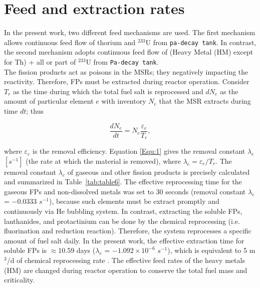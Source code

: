 \section{Feed and extraction rates}
In the present work, two different feed mechanisms are used. The first mechanism allows continuous feed flow of thorium and $^{233}$U from \texttt{pa-decay tank}. In contrast, the second mechanism adopts continuous feed flow of (Heavy Metal (HM) except for Th) + all or part of $^{233}$U from \texttt{Pa-decay tank}.\\
The fission products act as poisons in the MSRs; they negatively impacting the reactivity. Therefore, \gls{FPs} must be extracted during reactor operation. Consider $T_{r}$ as the time during which the total fuel salt is reprocessed and $dN_{e}$ as the amount of particular element $e$ with inventory $N_{e}$ that the \gls{MSR} extracts during time $dt$; thus \cite{nuttin2005potential}

\begin{equation}
\label{Equ:1}
\dfrac{dN_{e}}{dt} = N_{e}\dfrac{\varepsilon_{e}}{T_{r}},	
\end{equation}

where $\varepsilon_{e}$ is the removal efficiency. Equation \ref{Equ:1} gives the removal constant $\lambda_{e}$ $[s^{-1}]$ (the rate at which the material is removed), where $\lambda_{e}=\varepsilon_{e}/T_{r}$. The removal constant $\lambda_{e}$ of gaseous and other fission products is precisely calculated and summarized in Table~\ref{tab:table6}.
The effective reprocessing time for the gaseous \gls{FPs} and non-dissolved metals was set to 30 seconds (removal constant $\lambda_{e}$ = $-0.0333$ $s^{-1}$), because such elements must be extract promptly and continuously via He bubbling system. In contrast, extracting the soluble \gls{FPs}, lanthanides, and protactinium can be done by the chemical reprocessing (i.e. fluorination and reduction reaction). Therefore, the system reprocesses a specific amount of fuel salt daily. In the present work, the effective extraction time for soluble \gls{FPs} is $\approx$10.59 days ($\lambda_{e}$ = $-1.092\times10^{-6}$ $s^{-1}$), which is equivalent to 5 m$^3$/d of chemical reprocessing rate \cite{nuttin2005potential,li_optimization_2018}. The effective feed rates of the heavy metals (HM) are changed during reactor operation to conserve the total fuel mass and criticality.


